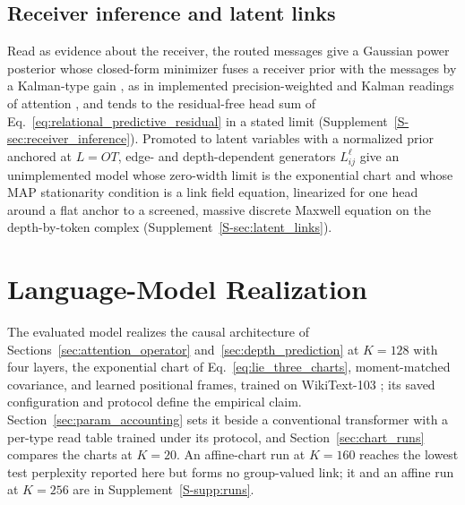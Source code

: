 \documentclass[twoside,11pt]{article}
\begin{document}
\subsection{Receiver inference and latent links}
\label{sec:probabilistic_extensions}
Read as evidence about the receiver, the routed messages give a Gaussian power posterior whose closed-form minimizer fuses a receiver prior with the messages by a Kalman-type gain \citep{Kalman1960}, as in implemented precision-weighted and Kalman readings of attention \citep{Racioppo2025RobustFilter,Shaj2026KalmanLinear,Long2026PrecisionTracked}, and tends to the residual-free head sum of Eq.~\eqref{eq:relational_predictive_residual} in a stated limit (Supplement~\ref{S-sec:receiver_inference}). Promoted to latent variables with a normalized prior anchored at $L=OT$, edge- and depth-dependent generators $L^{\ell}_{ij}$ give an unimplemented model whose zero-width limit is the exponential chart and whose MAP stationarity condition is a link field equation, linearized for one head around a flat anchor to a screened, massive discrete Maxwell equation on the depth-by-token complex (Supplement~\ref{S-sec:latent_links}).


\section{Language-Model Realization}
\label{sec:lm_realization}

The evaluated model realizes the causal architecture of Sections~\ref{sec:attention_operator} and~\ref{sec:depth_prediction} at $K=128$ with four layers, the exponential chart of Eq.~\eqref{eq:lie_three_charts}, moment-matched covariance, and learned positional frames, trained on WikiText-103 \citep{merity2017pointer}; its saved configuration and protocol define the empirical claim. Section~\ref{sec:param_accounting} sets it beside a conventional transformer with a per-type read table trained under its protocol, and Section~\ref{sec:chart_runs} compares the charts at $K=20$. An affine-chart run at $K=160$ reaches the lowest test perplexity reported here but forms no group-valued link; it and an affine run at $K=256$ are in Supplement~\ref{S-supp:runs}.
\end{document}
